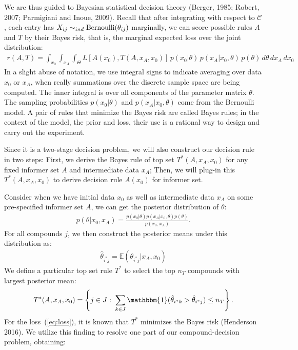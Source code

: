 \documentclass[12pt]{article}
\begin{document}
We are thus guided to Bayesian statistical decision theory (Berger, 1985;
Robert, 2007; Parmigiani and Inoue, 2009). Recall that after integrating with respect to $\mathcal{C}$, each entry has $X_{ij} \sim_{ind} {\rm Bernoulli}(\theta_{ij})$ marginally, we can score possible rules $A$ and $T$ by their Bayes risk, that is, the marginal expected loss over the joint distribution:
\begin{eqnarray}
\label{eq:risk}
r(A, T) 
= \int_{x_0} \int_{x_A} \int_\Theta  L\left[ A(x_0), T(A,x_A,x_0) \right] \,
 p(x_0| \theta) \, p(x_A|x_0, \theta) \, p(\theta) \, d\theta \, d x_A \, d x_0
\end{eqnarray}
In a slight abuse of notation, we use integral signs to indicate averaging over data $x_0$ or 
$x_A$, when really summations over the discrete sample space are being computed.  The inner
integral is over all components of the parameter matrix $\theta$. The sampling probabilities $p(x_0|\theta)$ and $p(x_A|x_0,\theta)$ 
come from the Bernoulli model.  A pair of rules that
minimize the Bayes risk are called Bayes rules; 
in the context of the model, the prior and loss, their use is
a rational way to design and carry out the experiment.

Since it is a two-stage decision problem, we will also construct our decision rule in two steps: First, we derive the Bayes rule of top set $T^*(A,x_A,x_0)$ for any fixed informer set $A$ and intermediate data $x_A$; Then, we will plug-in this $T^*(A,x_A,x_0)$ to derive decision rule $A(x_0)$ for informer set. 

Consider when we have initial data $x_0$ as well as intermediate data $x_A$ on
some pre-specified informer set $A$, we can get the posterior distribution of $\theta$:
\begin{eqnarray*}
p(\theta|x_0,x_A) = \frac{ p(x_0|\theta) p(x_A|x_0, \theta) p(\theta) }{ p(x_0, x_A) }.
\end{eqnarray*}
For all compounds $j$, we then construct the posterior means under this distribution as:
\begin{eqnarray*}
\hat \theta_{i^*j} = \mathbb{E}\left( \theta_{i^*j} |x_A, x_0 \right)
\end{eqnarray*}
We define a particular top set rule $T^*$ to select the top $n_T$ compounds with largest posterior mean:
\begin{eqnarray}
\label{eq:topset}
T^*(A,x_A,x_0) = \left\{ j \in J: \; \sum_{k\in J} \mathbbm{1}(\hat \theta_{i^*k} > \hat \theta_{i^*j}) \leq n_T \right\}.
\end{eqnarray}
For the loss~(\ref{eq:loss}), it is known that $T^*$ minimizes the Bayes risk (Henderson 2016).
We utilize this finding to resolve one part of our compound-decision problem, obtaining:
\end{document}
